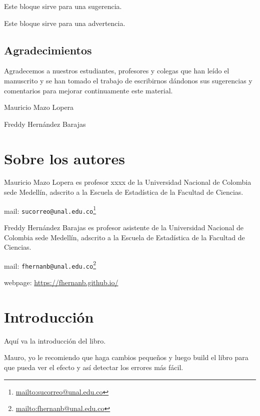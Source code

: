 \documentclass[10pt,]{krantz}
\renewcommand{\href}[2]{#2\footnote{\url{#1}}}
\let\BeginKnitrBlock\begin \let\EndKnitrBlock\end
\begin{document}
\BeginKnitrBlock{rmdtip}
Este bloque sirve para una sugerencia.
\EndKnitrBlock{rmdtip}

\BeginKnitrBlock{rmdwarning}
Este bloque sirve para una advertencia.
\EndKnitrBlock{rmdwarning}

\section*{Agradecimientos}\label{agradecimientos}


Agradecemos a nuestros estudiantes, profesores y colegas que han leído
el manuscrito y se han tomado el trabajo de escribirnos dándonos sus
sugerencias y comentarios para mejorar continuamente este material.

\BeginKnitrBlock{flushright}
Mauricio Mazo Lopera

Freddy Hernández Barajas
\EndKnitrBlock{flushright}

\chapter*{Sobre los autores}\label{sobre-los-autores}


Mauricio Mazo Lopera es profesor xxxx de la Universidad Nacional de
Colombia sede Medellín, adscrito a la Escuela de Estadística de la
Facultad de Ciencias.

mail:
\href{mailto:sucorreo@unal.edu.co}{\nolinkurl{sucorreo@unal.edu.co}}

\vspace{1cm}

Freddy Hernández Barajas es profesor asistente de la Universidad
Nacional de Colombia sede Medellín, adscrito a la Escuela de Estadística
de la Facultad de Ciencias.

mail:
\href{mailto:fhernanb@unal.edu.co}{\nolinkurl{fhernanb@unal.edu.co}}

webpage: \url{https://fhernanb.github.io/}

\mainmatter

\chapter{Introducción}\label{intro}

Aquí va la introducción del libro.

\BeginKnitrBlock{rmdwarning}
Mauro, yo le recomiendo que haga cambios pequeños y luego build el libro
para que pueda ver el efecto y así detectar los errores más fácil.
\EndKnitrBlock{rmdwarning}
\end{document}
